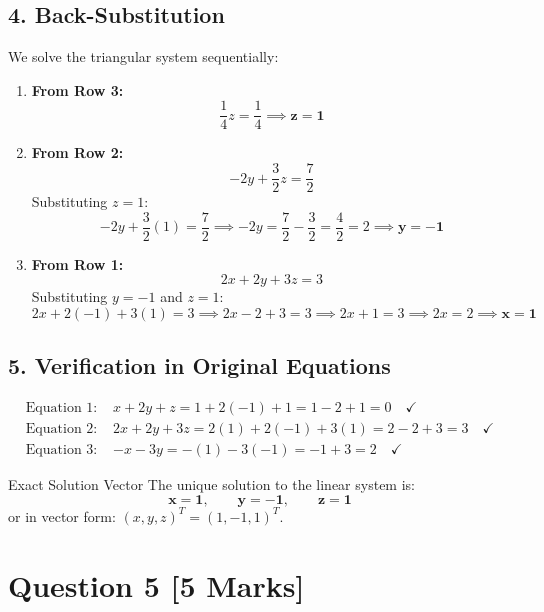 \documentclass[11pt,a4paper]{article}
\begin{document}
\subsection*{4. Back-Substitution}
We solve the triangular system sequentially:
\begin{enumerate}[leftmargin=*]
    \item \textbf{From Row 3:}
    \[
    \frac{1}{4} z = \frac{1}{4} \implies \mathbf{z = 1}
    \]
    \item \textbf{From Row 2:}
    \[
    -2y + \frac{3}{2} z = \frac{7}{2}
    \]
    Substituting $z = 1$:
    \[
    -2y + \frac{3}{2}(1) = \frac{7}{2} \implies -2y = \frac{7}{2} - \frac{3}{2} = \frac{4}{2} = 2 \implies \mathbf{y = -1}
    \]
    \item \textbf{From Row 1:}
    \[
    2x + 2y + 3z = 3
    \]
    Substituting $y = -1$ and $z = 1$:
    \[
    2x + 2(-1) + 3(1) = 3 \implies 2x - 2 + 3 = 3 \implies 2x + 1 = 3 \implies 2x = 2 \implies \mathbf{x = 1}
    \]
\end{enumerate}

\subsection*{5. Verification in Original Equations}
\begin{align*}
\text{Equation 1: } & x + 2y + z = 1 + 2(-1) + 1 = 1 - 2 + 1 = 0 \quad \checkmark \\
\text{Equation 2: } & 2x + 2y + 3z = 2(1) + 2(-1) + 3(1) = 2 - 2 + 3 = 3 \quad \checkmark \\
\text{Equation 3: } & -x - 3y = -(1) - 3(-1) = -1 + 3 = 2 \quad \checkmark
\end{align*}

\begin{answerbox}{Exact Solution Vector}
The unique solution to the linear system is:
\begin{equation}
\mathbf{x = 1, \qquad y = -1, \qquad z = 1}
\end{equation}
or in vector form: $(x, y, z)^T = (1, -1, 1)^T$.
\end{answerbox}

\newpage

\section*{Question 5 \hfill \normalsize\normalfont\color{darkgray}[5 Marks]}
\end{document}
